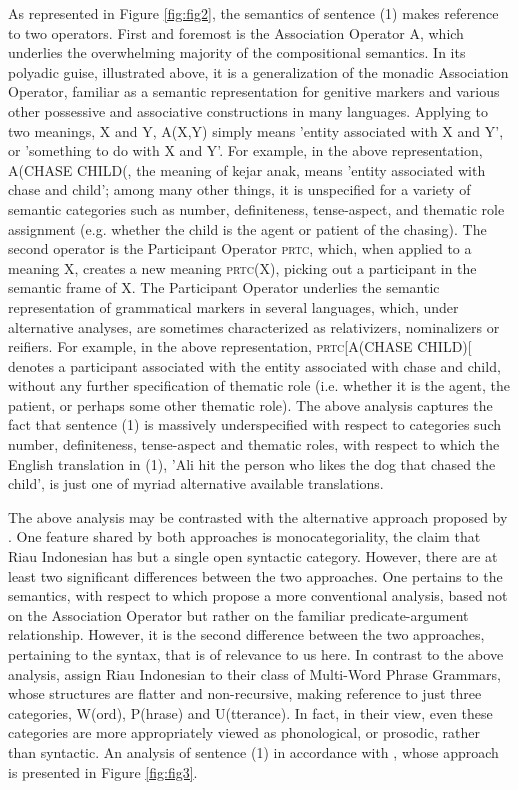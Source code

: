 \documentclass[output=paper,colorlinks,citecolor=brown
]{langscibook}
\begin{document}
As represented in Figure \ref{fig:fig2}, the semantics of sentence (1) makes reference to two operators. First and foremost is the Association Operator A, which underlies the overwhelming majority of the compositional semantics. In its polyadic guise, illustrated above, it is a generalization of the monadic Association Operator, familiar as a semantic representation for genitive markers and various other possessive and associative constructions in many languages. Applying to two meanings, X and Y, A(X,Y) simply means 'entity associated with X and Y', or 'something to do with X and Y'. For example, in the above representation, A(CHASE CHILD(, the meaning of kejar anak, means 'entity associated with chase and child'; among many other things, it is unspecified for a variety of semantic categories such as number, definiteness, tense-aspect, and thematic role assignment (e.g. whether the child is the agent or patient of the chasing). The second operator is the Participant Operator \textsc{prtc}, which, when applied to a meaning X, creates a new meaning \textsc{prtc}(X), picking out a participant in the semantic frame of X. The Participant Operator underlies the semantic representation of grammatical markers in several languages, which, under alternative analyses, are sometimes characterized as relativizers, nominalizers or reifiers. For example, in the above representation, \textsc{prtc}[A(CHASE CHILD)[ denotes a participant associated with the entity associated with chase and child, without any further specification of thematic role (i.e. whether it is the agent, the patient, or perhaps some other thematic role). The above analysis captures the fact that sentence (1) is massively underspecified with respect to categories such number, definiteness, tense-aspect and thematic roles, with respect to which the English translation in (1), 'Ali hit the person who likes the dog that chased the child', is just one of myriad alternative available translations.

The above analysis may be contrasted with the alternative approach proposed by \citet{jackendoff2014syntax,jackendoff2017linear}. One feature shared by both approaches is monocategoriality, the claim that Riau Indonesian has but a single open syntactic category.  However, there are at least two significant differences between the two approaches.  One pertains to the semantics, with respect to which \citet{jackendoff2014syntax,jackendoff2017linear} propose a more conventional analysis, based not on the Association Operator but rather on the familiar predicate-argument relationship.  However, it is the second difference between the two approaches, pertaining to the syntax, that is of relevance to us here.  In contrast to the above analysis, \citet{jackendoff2014syntax,jackendoff2017linear} assign Riau Indonesian to their class of Multi-Word Phrase Grammars, whose structures are flatter and non-recursive, making reference to just three categories, W(ord), P(hrase) and U(tterance).  In fact, in their view, even these categories are more appropriately viewed as phonological, or prosodic, rather than syntactic.  An analysis of sentence (1) in accordance with \citet{jackendoff2014syntax,jackendoff2017linear}, whose approach is presented in Figure \ref{fig:fig3}.
\end{document}
